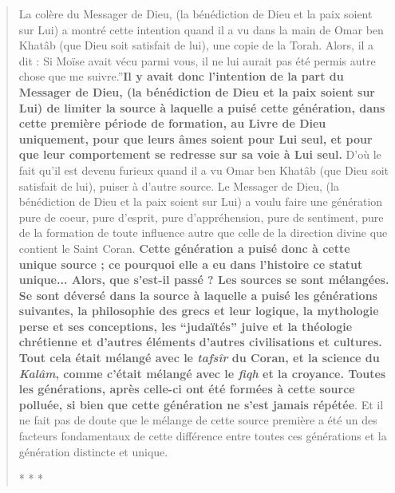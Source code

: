 \begin{quote}
La colère du Messager de Dieu, (la bénédiction de Dieu et la paix soient
sur Lui) a montré cette intention quand il a vu dans la main de Omar ben
Khatâb (que Dieu soit satisfait de lui), une copie de la Torah. Alors,
il a dit : Si Moïse avait vécu parmi vous, il ne lui aurait pas été
permis autre chose que me suivre.''\textbf{Il y avait donc l'intention
de la part du Messager de Dieu, (la bénédiction de Dieu et la paix
soient sur Lui) de limiter la source à laquelle a puisé cette
génération, dans cette première période de formation, au Livre de Dieu
uniquement, pour que leurs âmes soient pour Lui seul, et pour que leur
comportement se redresse sur sa voie à Lui seul.} D'où le fait qu'il est
devenu furieux quand il a vu Omar ben Khatâb (que Dieu soit satisfait de
lui), puiser à d'autre source. Le Messager de Dieu, (la bénédiction de
Dieu et la paix soient sur Lui) a voulu faire une génération pure de
coeur, pure d'esprit, pure d'appréhension, pure de sentiment, pure de la
formation de toute influence autre que celle de la direction divine que
contient le Saint Coran. \textbf{Cette génération a puisé donc à cette
unique source ; ce pourquoi elle a eu dans l'histoire ce statut
unique... Alors, que s'est-il passé ? Les sources se sont mélangées. Se
sont déversé dans la source à laquelle a puisé les générations
suivantes, la philosophie des grecs et leur logique, la mythologie perse
et ses conceptions, les ``judaïtés'' juive et la théologie chrétienne et
d'autres éléments d'autres civilisations et cultures. Tout cela était
mélangé avec le \emph{tafsîr} du Coran, et la science du \emph{Kalâm},
comme c'était mélangé avec le \emph{fiqh} et la croyance. Toutes les
générations, après celle-ci ont été formées à cette source polluée, si
bien que cette génération ne s'est jamais répétée}. Et il ne fait pas de
doute que le mélange de cette source première a été un des facteurs
fondamentaux de cette différence entre toutes ces générations et la
génération distincte et unique.

* * *


\end{quote}
